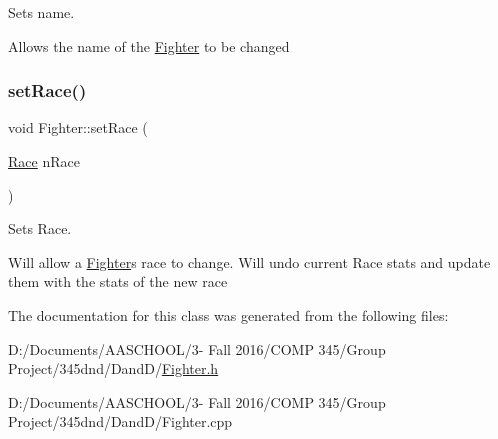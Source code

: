 Sets name. 

Allows the name of the \hyperlink{class_fighter}{Fighter} to be changed \hypertarget{class_fighter_abd0aa443cda40a70c7df3bf1949a9e79}{}\label{class_fighter_abd0aa443cda40a70c7df3bf1949a9e79} 
\subsubsection{\texorpdfstring{set\+Race()}{setRace()}}
{\footnotesize\ttfamily void Fighter\+::set\+Race (\begin{DoxyParamCaption}\item[{\hyperlink{_entity_8h_aa2df4028f474807638d438104900b003}{Race}}]{n\+Race }\end{DoxyParamCaption})}



Sets Race. 

Will allow a \hyperlink{class_fighter}{Fighter}\textquotesingle{}s race to change. Will undo current Race stats and update them with the stats of the new race 

The documentation for this class was generated from the following files\+:\begin{DoxyCompactItemize}
\item 
D\+:/\+Documents/\+A\+A\+S\+C\+H\+O\+O\+L/3-\/ Fall 2016/\+C\+O\+M\+P 345/\+Group Project/345dnd/\+Dand\+D/\hyperlink{_fighter_8h}{Fighter.\+h}\item 
D\+:/\+Documents/\+A\+A\+S\+C\+H\+O\+O\+L/3-\/ Fall 2016/\+C\+O\+M\+P 345/\+Group Project/345dnd/\+Dand\+D/Fighter.\+cpp\end{DoxyCompactItemize}
